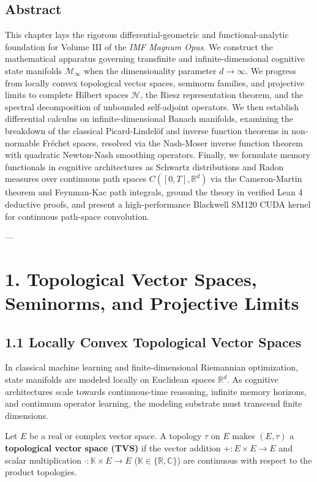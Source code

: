 \documentclass[11pt,twoside,openright]{amsbook}
\begin{document}
\subsection{Abstract}
This chapter lays the rigorous differential-geometric and functional-analytic foundation for Volume III of the \textit{IMF Magnum Opus}. We construct the mathematical apparatus governing transfinite and infinite-dimensional cognitive state manifolds $\mathcal{M}_\infty$ when the dimensionality parameter $d \to \infty$. We progress from locally convex topological vector spaces, seminorm families, and projective limits to complete Hilbert spaces $\mathcal{H}$, the Riesz representation theorem, and the spectral decomposition of unbounded self-adjoint operators. We then establish differential calculus on infinite-dimensional Banach manifolds, examining the breakdown of the classical Picard-Lindelöf and inverse function theorems in non-normable Fréchet spaces, resolved via the Nash-Moser inverse function theorem with quadratic Newton-Nash smoothing operators. Finally, we formulate memory functionals in cognitive architectures as Schwartz distributions and Radon measures over continuous path spaces $C([0, T], \mathbb{R}^d)$ via the Cameron-Martin theorem and Feynman-Kac path integrals, ground the theory in verified Lean 4 deductive proofs, and present a high-performance Blackwell SM120 CUDA kernel for continuous path-space convolution.

---

\section{1. Topological Vector Spaces, Seminorms, and Projective Limits}

\subsection{1.1 Locally Convex Topological Vector Spaces}
In classical machine learning and finite-dimensional Riemannian optimization, state manifolds are modeled locally on Euclidean spaces $\mathbb{R}^d$. As cognitive architectures scale towards continuous-time reasoning, infinite memory horizons, and continuum operator learning, the modeling substrate must transcend finite dimensions.

Let $E$ be a real or complex vector space. A topology $\tau$ on $E$ makes $(E, \tau)$ a \textbf{topological vector space (TVS)} if the vector addition $+: E \times E \to E$ and scalar multiplication $\cdot: \mathbb{K} \times E \to E$ ($\mathbb{K} \in \{\mathbb{R}, \mathbb{C}\}$) are continuous with respect to the product topologies.
\end{document}
